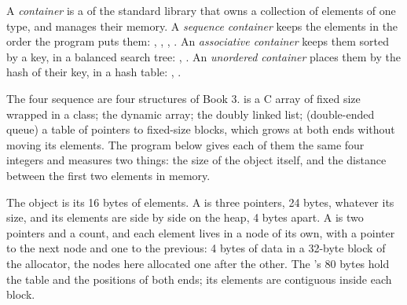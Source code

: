 \begin{definition}[Container]\label{def:b2:cpp-standard-library:container}
A \emph{container} is a  of the standard library that owns a collection of
elements of one type, and manages their memory. A \emph{sequence container} keeps the
elements in the order the program puts them: , , ,
. An \emph{associative container} keeps them sorted by a key, in a
balanced search tree: , . An \emph{unordered container}
places them by the hash of their key, in a hash table: , .
\end{definition}

The four sequence  are four structures of Book 3.  is a C array of fixed size
wrapped in a class;  the dynamic array;  the doubly linked list;
 (double-ended queue) a table of pointers to fixed-size blocks, which grows at both ends without
moving its elements. The program below gives each of them the same four integers and measures two things: the size
of the object itself, and the distance between the first two elements in memory.

\label{lst:b2:cpp-standard-library:containers}

\label{out:b2:cpp-standard-library:containers}

The  object is its 16 bytes of elements. A  is three pointers, 24 bytes, whatever its size,
and its elements are side by side on the heap, 4 bytes apart. A  is two pointers and a count, and each
element lives in a node of its own, with a pointer to the next node and one to the previous: 4 bytes of data in
a 32-byte block of the allocator, the nodes here allocated one after the other. The 's 80 bytes hold
the table and the positions of both ends; its elements are contiguous inside each block.

